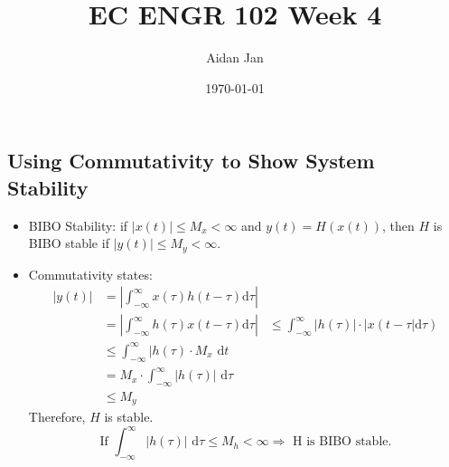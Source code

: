 \documentclass[10pt]{article}
\title{EC ENGR 102 Week 4}
\author{Aidan Jan}
\date{\today}
\begin{document}
\maketitle

\subsection*{Using Commutativity to Show System Stability}
\begin{itemize}
    \item BIBO Stability: if $|x(t)| \leq M_x < \infty$ and $y(t) = H(x(t))$, then $H$ is BIBO stable if $|y(t)| \leq M_y < \infty$.
    \item Commutativity states:
    \begin{align*}
        |y(t)| &= \left|\int_{-\infty}^\infty x(\tau) h(t - \tau) \text{d}\tau\right|\\
        &= \left|\int_{-\infty}^\infty h(\tau) x(t - \tau) \text{d}\tau \right|
        &\leq \int_{-\infty}^\infty |h(\tau)| \cdot |x(t - \tau| \text{d}\tau)\\
        &\leq \int_{-\infty}^\infty |h(\tau) \cdot M_x \text{ d}t\\
        &= M_x \cdot \int_{-\infty}^\infty |h(\tau)| \text{ d}\tau\\
        &\leq M_y
    \end{align*}
    Therefore, $H$ is stable.
    \[\text{If } \int_{-\infty}^\infty |h(\tau)| \text{ d}\tau \leq M_h < \infty \Rightarrow \text{ H is BIBO stable.}\]

    
\end{itemize}
\end{document}
